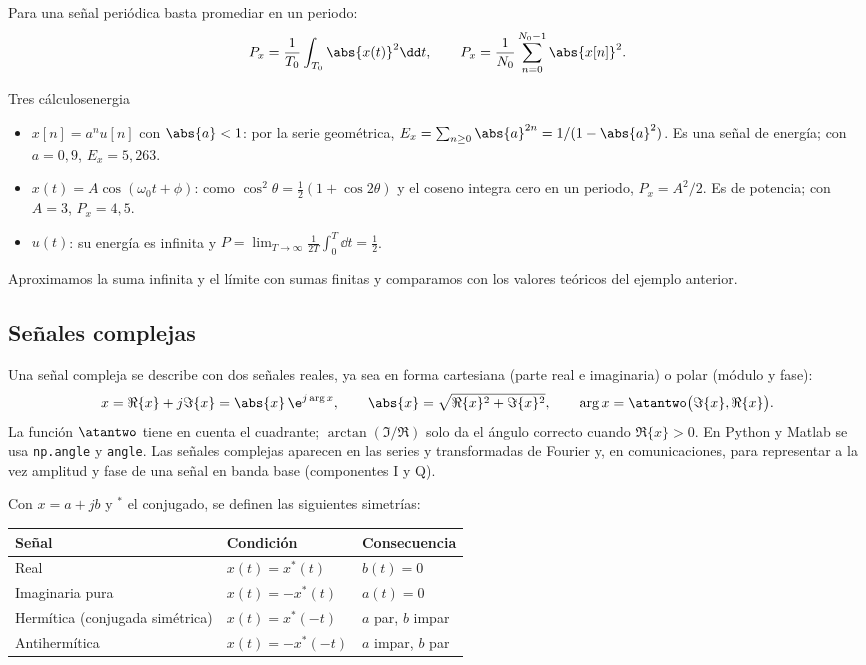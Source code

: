 \documentclass[11pt,a4paper]{scrartcl}
\begin{document}
Para una señal periódica basta promediar en un periodo:
\[
  P_x=\frac{1}{T_0}\int_{T_0}\abs{x(t)}^2\dd t,\qquad P_x=\frac{1}{N_0}\sum_{n=0}^{N_0-1}\abs{x[n]}^2.
\]

\begin{ejemplo}{Tres cálculos}{energia}
  \begin{itemize}
    \item $x[n]=a^n u[n]$ con $\abs{a}<1$: por la serie geométrica, $E_x=\sum_{n\ge0}\abs{a}^{2n}=1/(1-\abs{a}^2)$. Es una señal de energía; con $a=0{,}9$, $E_x=5{,}263$.
    \item $x(t)=A\cos(\omega_0t+\phi)$: como $\cos^2\theta=\tfrac12(1+\cos2\theta)$ y el coseno integra cero en un periodo, $P_x=A^2/2$. Es de potencia; con $A=3$, $P_x=4{,}5$.
    \item $u(t)$: su energía es infinita y $P=\lim_{T\to\infty}\frac{1}{2T}\int_0^T\dd t=\tfrac12$.
  \end{itemize}
\end{ejemplo}

\begin{encodigo}
  Aproximamos la suma infinita y el límite con sumas finitas y comparamos con los valores teóricos del ejemplo anterior.
\end{encodigo}

\subsection{Señales complejas}

Una señal compleja se describe con dos señales reales, ya sea en forma cartesiana (parte real e imaginaria) o polar (módulo y fase):
\[
  x=\Re\{x\}+j\Im\{x\}=\abs{x}\,\e^{j\arg x},\qquad
  \abs{x}=\sqrt{\Re\{x\}^2+\Im\{x\}^2},\qquad \arg x=\atantwo\big(\Im\{x\},\Re\{x\}\big).
\]
La función $\atantwo$ tiene en cuenta el cuadrante; $\arctan(\Im/\Re)$ solo da el ángulo correcto cuando $\Re\{x\}>0$. En Python y Matlab se usa \texttt{np.angle} y \texttt{angle}. Las señales complejas aparecen en las series y transformadas de Fourier y, en comunicaciones, para representar a la vez amplitud y fase de una señal en banda base (componentes I y Q).

Con $x=a+jb$ y $^*$ el conjugado, se definen las siguientes simetrías:

\begin{center}
  \renewcommand{\arraystretch}{1.2}
  \begin{tabular}{@{}lll@{}}
    \toprule
    Señal & Condición & Consecuencia\\\midrule
    Real & $x(t)=x^*(t)$ & $b(t)=0$\\
    Imaginaria pura & $x(t)=-x^*(t)$ & $a(t)=0$\\
    Hermítica (conjugada simétrica) & $x(t)=x^*(-t)$ & $a$ par, $b$ impar\\
    Antihermítica & $x(t)=-x^*(-t)$ & $a$ impar, $b$ par\\\bottomrule
  \end{tabular}
\end{center}
\end{document}
